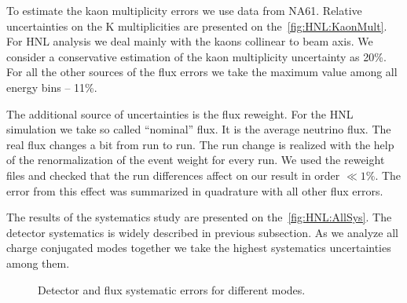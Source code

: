 \documentclass[../main.tex]{subfiles}
\begin{document}
To estimate the kaon multiplicity errors we use data from NA61. Relative uncertainties on the K multiplicities are presented on the~\autoref{fig:HNL:KaonMult}. For HNL analysis we deal mainly with the kaons collinear to beam axis. We consider a conservative estimation of the kaon multiplicity uncertainty as 20\%. For all the other sources of the flux errors we take the maximum value among all energy bins -- 11\%.


The additional source of uncertainties is the flux reweight. For the HNL simulation we take so called ``nominal'' flux. It is the average neutrino flux. The real flux changes a bit from run to run. The run change is realized with the help of the renormalization of the event weight for every run. We used the reweight files and checked that the run differences affect on our result in order $\ll1\%$. The error from this effect was summarized in quadrature with all other flux errors.

The results of the systematics study are presented on the~\autoref{fig:HNL:AllSys}. The detector systematics is widely described in previous subsection. As we analyze all charge conjugated modes together we take the highest systematics uncertainties among them.

\begin{figure}[!ht]
    \begin{center}
    \begin{minipage}{0.49\linewidth}
    \end{minipage}
    \hfill
    \begin{minipage}{0.49\linewidth}
    \end{minipage}
    \vfill
    \begin{minipage}{0.49\linewidth}
    \end{minipage}
    \caption{Detector and flux systematic errors for different modes.}
    \label{fig:HNL:AllSys}
        \end{center}
\end{figure}
\end{document}
